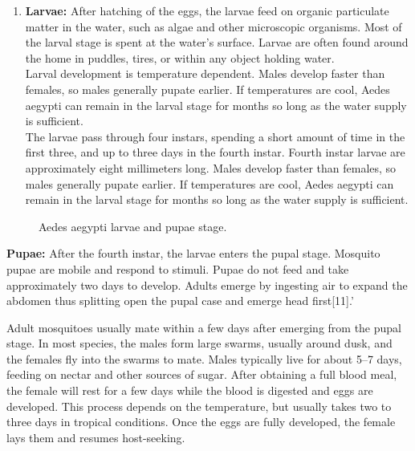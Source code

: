 \documentclass[11pt]{exam}
\begin{document}
\begin{questions}
\begin{enumerate}
\item \textbf{Larvae:} After hatching of the eggs, the larvae feed on organic particulate matter in the water, such as algae and other microscopic organisms. Most of the larval stage is spent at the water's surface. Larvae are often found around the home in puddles, tires, or within any object holding water.\\ %
Larval development is temperature dependent. Males develop faster than females, so males generally pupate earlier. If temperatures are cool, Aedes aegypti can remain in the larval stage for months so long as the water supply is sufficient. \\
The larvae pass through four instars, spending a short amount of time in the first three, and up to three days in the fourth instar. Fourth instar larvae are approximately eight millimeters long. 
Males develop faster than females, so males generally pupate earlier. If temperatures are cool, Aedes aegypti can remain in the larval stage for months so long as the water supply is sufficient.\\ 
\end{enumerate}
\begin{figure}[H]
  \centering
    \hfill
  \caption{Aedes aegypti larvae and pupae stage.}
  \label{Ae.Aegypti life stages.}    
\end{figure} 

\item \textbf{Pupae:} After the fourth instar, the larvae enters the pupal stage. Mosquito pupae are mobile and respond to stimuli. Pupae do not feed and take approximately two days to develop. Adults emerge by ingesting air to expand the abdomen thus splitting open the pupal case and emerge head first[11].'\\

\item Adult mosquitoes usually mate within a few days after emerging from the pupal stage. In most species, the males form large swarms, usually around dusk, and the females fly into the swarms to mate. Males typically live for about 5–7 days, feeding on nectar and other sources of sugar. After obtaining a full blood meal, the female will rest for a few days while the blood is digested and eggs are developed. This process depends on the temperature, but usually takes two to three days in tropical conditions. Once the eggs are fully developed, the female lays them and resumes host-seeking. \\


\end{questions}
\end{document}
